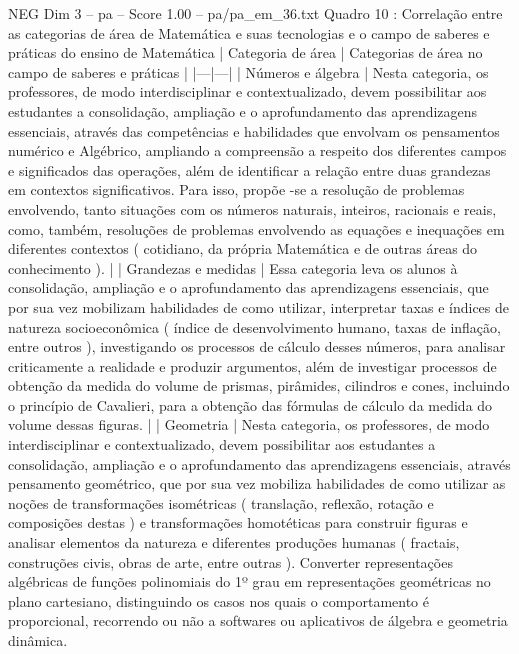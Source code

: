 \begin{textsample}{NEG Dim 3 – pa – Score 1.00 – pa/pa\_em\_36.txt}  \label{ex:f3_neg_060}
Quadro 10 : Correlação entre as categorias de área de Matemática e suas tecnologias e o campo de saberes e práticas do ensino de Matemática | Categoria de área | Categorias de área no campo de saberes e práticas | |---|---| | Números e álgebra | Nesta categoria, os professores, de modo interdisciplinar e contextualizado, devem possibilitar aos estudantes a consolidação, ampliação e o aprofundamento das aprendizagens essenciais, através das competências e habilidades que envolvam os pensamentos numérico e Algébrico, ampliando a compreensão a respeito dos diferentes campos e significados das operações, além de identificar a relação entre duas grandezas em contextos significativos.
Para isso, propõe -se a resolução de problemas envolvendo, tanto situações com os números naturais, inteiros, racionais e reais, como, também, resoluções de problemas envolvendo as equações e inequações em diferentes contextos ( cotidiano, da própria Matemática e de outras áreas do conhecimento ). | | Grandezas e medidas | Essa categoria leva os alunos à consolidação, ampliação e o aprofundamento das aprendizagens essenciais, que por sua vez mobilizam habilidades de como utilizar, interpretar taxas e índices de natureza socioeconômica ( índice de desenvolvimento humano, taxas de inflação, entre outros ), investigando os processos de cálculo desses números, para analisar criticamente a realidade e produzir argumentos, além de investigar processos de obtenção da medida do volume de prismas, pirâmides, cilindros e cones, incluindo o princípio de Cavalieri, para a obtenção das fórmulas de cálculo da medida do volume dessas figuras. | | Geometria | Nesta categoria, os professores, de modo interdisciplinar e contextualizado, devem possibilitar aos estudantes a consolidação, ampliação e o aprofundamento das aprendizagens essenciais, através pensamento geométrico, que por sua vez mobiliza habilidades de como utilizar as noções de transformações isométricas ( translação, reflexão, rotação e composições destas ) e transformações homotéticas para construir figuras e analisar elementos da natureza e diferentes produções humanas ( fractais, construções civis, obras de arte, entre outras ).
Converter representações algébricas de funções polinomiais do 1º grau em representações geométricas no plano cartesiano, distinguindo os casos nos quais o comportamento é proporcional, recorrendo ou não a softwares ou aplicativos de álgebra e geometria dinâmica.

\end{textsample}
